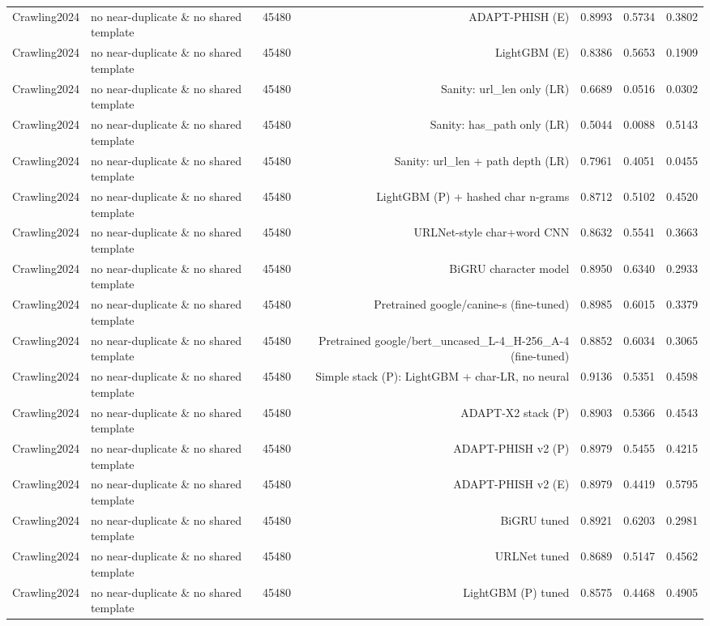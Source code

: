 \begin{table}[t]
\begin{tabular}{llrrrrr}
Crawling2024 & no near-duplicate \& no shared template & 45480 & ADAPT-PHISH (E) & 0.8993 & 0.5734 & 0.3802 \\
Crawling2024 & no near-duplicate \& no shared template & 45480 & LightGBM (E) & 0.8386 & 0.5653 & 0.1909 \\
Crawling2024 & no near-duplicate \& no shared template & 45480 & Sanity: url\_len only (LR) & 0.6689 & 0.0516 & 0.0302 \\
Crawling2024 & no near-duplicate \& no shared template & 45480 & Sanity: has\_path only (LR) & 0.5044 & 0.0088 & 0.5143 \\
Crawling2024 & no near-duplicate \& no shared template & 45480 & Sanity: url\_len + path depth (LR) & 0.7961 & 0.4051 & 0.0455 \\
Crawling2024 & no near-duplicate \& no shared template & 45480 & LightGBM (P) + hashed char n-grams & 0.8712 & 0.5102 & 0.4520 \\
Crawling2024 & no near-duplicate \& no shared template & 45480 & URLNet-style char+word CNN & 0.8632 & 0.5541 & 0.3663 \\
Crawling2024 & no near-duplicate \& no shared template & 45480 & BiGRU character model & 0.8950 & 0.6340 & 0.2933 \\
Crawling2024 & no near-duplicate \& no shared template & 45480 & Pretrained google/canine-s (fine-tuned) & 0.8985 & 0.6015 & 0.3379 \\
Crawling2024 & no near-duplicate \& no shared template & 45480 & Pretrained google/bert\_uncased\_L-4\_H-256\_A-4 (fine-tuned) & 0.8852 & 0.6034 & 0.3065 \\
Crawling2024 & no near-duplicate \& no shared template & 45480 & Simple stack (P): LightGBM + char-LR, no neural & 0.9136 & 0.5351 & 0.4598 \\
Crawling2024 & no near-duplicate \& no shared template & 45480 & ADAPT-X2 stack (P) & 0.8903 & 0.5366 & 0.4543 \\
Crawling2024 & no near-duplicate \& no shared template & 45480 & ADAPT-PHISH v2 (P) & 0.8979 & 0.5455 & 0.4215 \\
Crawling2024 & no near-duplicate \& no shared template & 45480 & ADAPT-PHISH v2 (E) & 0.8979 & 0.4419 & 0.5795 \\
Crawling2024 & no near-duplicate \& no shared template & 45480 & BiGRU tuned & 0.8921 & 0.6203 & 0.2981 \\
Crawling2024 & no near-duplicate \& no shared template & 45480 & URLNet tuned & 0.8689 & 0.5147 & 0.4562 \\
Crawling2024 & no near-duplicate \& no shared template & 45480 & LightGBM (P) tuned & 0.8575 & 0.4468 & 0.4905 \\

\end{tabular}
\end{table}
